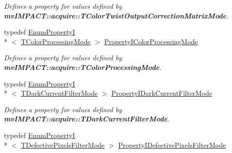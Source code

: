 \begin{DoxyCompactItemize}
\begin{DoxyCompactList}\small\item\em Defines a property for values defined by {\bfseries mv\+I\+M\+P\+A\+C\+T\+::acquire\+::\+T\+Color\+Twist\+Output\+Correction\+Matrix\+Mode}. \end{DoxyCompactList}\item 
\hypertarget{group___common_interface_gafa56b00b5309b5cb40e10b9eb07e1cf9}{typedef \hyperlink{classmv_i_m_p_a_c_t_1_1acquire_1_1_enum_property_i}{Enum\+Property\+I}\\*
$<$ \hyperlink{group___common_interface_ga906258e7f7e29527fd5edf23f03a7adb}{T\+Color\+Processing\+Mode} $>$ \hyperlink{group___common_interface_gafa56b00b5309b5cb40e10b9eb07e1cf9}{Property\+I\+Color\+Processing\+Mode}}\label{group___common_interface_gafa56b00b5309b5cb40e10b9eb07e1cf9}

\begin{DoxyCompactList}\small\item\em Defines a property for values defined by {\bfseries mv\+I\+M\+P\+A\+C\+T\+::acquire\+::\+T\+Color\+Processing\+Mode}. \end{DoxyCompactList}\item 
\hypertarget{group___common_interface_gade29cf3422c28d48e5d6c20cd9f47f1e}{typedef \hyperlink{classmv_i_m_p_a_c_t_1_1acquire_1_1_enum_property_i}{Enum\+Property\+I}\\*
$<$ \hyperlink{group___common_interface_ga529300ca9481f6773a3a6f7d360191ed}{T\+Dark\+Current\+Filter\+Mode} $>$ \hyperlink{group___common_interface_gade29cf3422c28d48e5d6c20cd9f47f1e}{Property\+I\+Dark\+Current\+Filter\+Mode}}\label{group___common_interface_gade29cf3422c28d48e5d6c20cd9f47f1e}

\begin{DoxyCompactList}\small\item\em Defines a property for values defined by {\bfseries mv\+I\+M\+P\+A\+C\+T\+::acquire\+::\+T\+Dark\+Current\+Filter\+Mode}. \end{DoxyCompactList}\item 
\hypertarget{group___common_interface_ga1833e6534b35ce9f81fdc3a80cc332d3}{typedef \hyperlink{classmv_i_m_p_a_c_t_1_1acquire_1_1_enum_property_i}{Enum\+Property\+I}\\*
$<$ \hyperlink{group___common_interface_ga026aca333783574cb87c7cd7bebfc2fd}{T\+Defective\+Pixels\+Filter\+Mode} $>$ \hyperlink{group___common_interface_ga1833e6534b35ce9f81fdc3a80cc332d3}{Property\+I\+Defective\+Pixels\+Filter\+Mode}}\label{group___common_interface_ga1833e6534b35ce9f81fdc3a80cc332d3}


\end{DoxyCompactItemize}
